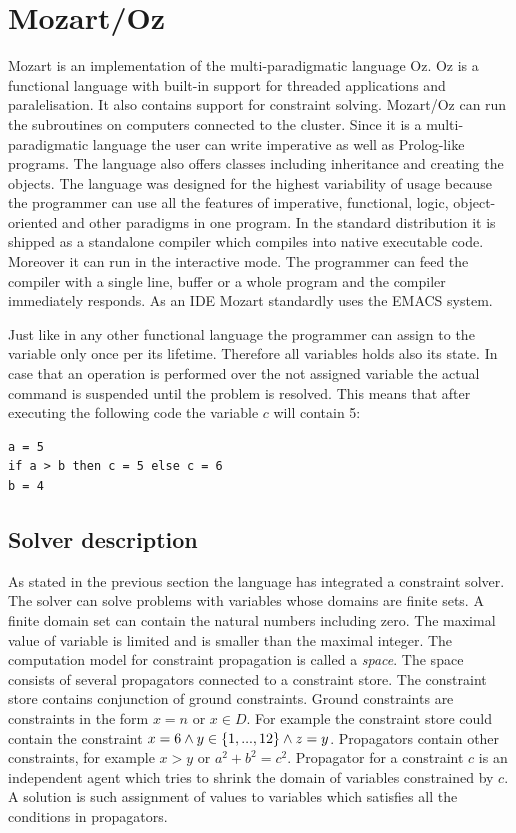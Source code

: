 \section{Mozart/Oz}

Mozart is an implementation of the multi-paradigmatic language Oz. Oz is a functional
language with built-in support for threaded applications and paralelisation. It also
contains support for constraint solving. Mozart/Oz can run the subroutines on computers
connected to the cluster. Since it is a multi-paradigmatic language the user
can write imperative as well as Prolog-like programs. The language also offers classes
including inheritance and creating the objects. The language was designed for the
highest variability of usage because the programmer can use all the features of imperative,
functional, logic, object-oriented and other paradigms in one program. In the standard distribution
it is shipped as a standalone compiler which compiles into native executable code.
Moreover it can run in the interactive mode. The programmer can feed the compiler with
a single line, buffer or a whole program and the compiler immediately responds. As an IDE
Mozart standardly uses the EMACS system.

Just like in any other functional language the programmer can assign to the variable 
only once per its lifetime. Therefore all variables holds also its state. In case that
an operation is performed over the not assigned variable the actual command is suspended
until the problem is resolved. This means that after executing the following code the
variable $c$ will contain 5:

\begin{verbatim}
a = 5
if a > b then c = 5 else c = 6
b = 4
\end{verbatim}

\subsection{Solver description}
As stated in the previous section the language has integrated a constraint solver. The solver
can solve problems with variables whose domains are finite sets. A finite domain
set can contain the natural numbers including zero. The maximal value of variable is limited and is smaller 
than the maximal integer. The computation model for constraint propagation is called 
a {\em space}. The space consists of several propagators connected to a constraint store.
The constraint store contains conjunction of ground constraints. Ground constraints
are constraints in the form $x=n$ or $x \in D$. For example the constraint store could
contain the constraint $x = 6 \wedge y \in \{1, ..., 12\} \wedge z = y$. Propagators contain
other constraints, for example $x>y$ or $a^2 + b^2 = c^2$. Propagator for a constraint
 $c$ is an independent agent which tries to shrink the domain of variables constrained
 by $c$. A solution is such  assignment of values to variables which satisfies all the conditions
 in propagators.
 
